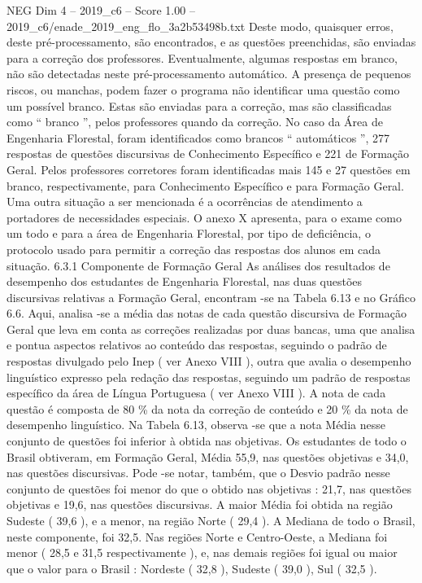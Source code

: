\begin{textsample}{NEG Dim 4 – 2019\_c6 – Score 1.00 – 2019\_c6/enade\_2019\_eng\_flo\_3a2b53498b.txt}
Deste modo, quaisquer erros, deste pré-processamento, são encontrados, e as questões preenchidas, são enviadas para a correção dos professores.
Eventualmente, algumas respostas em branco, não são detectadas neste pré-processamento automático.
A presença de pequenos riscos, ou manchas, podem fazer o programa não identificar uma questão como um possível branco.
Estas são enviadas para a correção, mas são classificadas como “ branco ”, pelos professores quando da correção.
No caso da Área de Engenharia Florestal, foram identificados como brancos “ automáticos ”, 277 respostas de questões discursivas de Conhecimento Específico e 221 de Formação Geral.
Pelos professores corretores foram identificadas mais 145 e 27 questões em branco, respectivamente, para Conhecimento Específico e para Formação Geral.
Uma outra situação a ser mencionada é a ocorrências de atendimento a portadores de necessidades especiais.
O anexo X apresenta, para o exame como um todo e para a área de Engenharia Florestal, por tipo de deficiência, o protocolo usado para permitir a correção das respostas dos alunos em cada situação. 6.3.1 Componente de Formação Geral As análises dos resultados de desempenho dos estudantes de Engenharia Florestal, nas duas questões discursivas relativas a Formação Geral, encontram -se na Tabela 6.13 e no Gráfico 6.6.
Aqui, analisa -se a média das notas de cada questão discursiva de Formação Geral que leva em conta as correções realizadas por duas bancas, uma que analisa e pontua aspectos relativos ao conteúdo das respostas, seguindo o padrão de respostas divulgado pelo Inep ( ver Anexo VIII ), outra que avalia o desempenho linguístico expresso pela redação das respostas, seguindo um padrão de respostas específico da área de Língua Portuguesa ( ver Anexo VIII ).
A nota de cada questão é composta de 80 \% da nota da correção de conteúdo e 20 \% da nota de desempenho linguístico.
Na Tabela 6.13, observa -se que a nota Média nesse conjunto de questões foi inferior à obtida nas objetivas.
Os estudantes de todo o Brasil obtiveram, em Formação Geral, Média 55,9, nas questões objetivas e 34,0, nas questões discursivas.
Pode -se notar, também, que o Desvio padrão nesse conjunto de questões foi menor do que o obtido nas objetivas : 21,7, nas questões objetivas e 19,6, nas questões discursivas.
A maior Média foi obtida na região Sudeste ( 39,6 ), e a menor, na região Norte ( 29,4 ).
A Mediana de todo o Brasil, neste componente, foi 32,5.
Nas regiões Norte e Centro-Oeste, a Mediana foi menor ( 28,5 e 31,5 respectivamente ), e, nas demais regiões foi igual ou maior que o valor para o Brasil : Nordeste ( 32,8 ), Sudeste ( 39,0 ), Sul ( 32,5 ).

\end{textsample}
